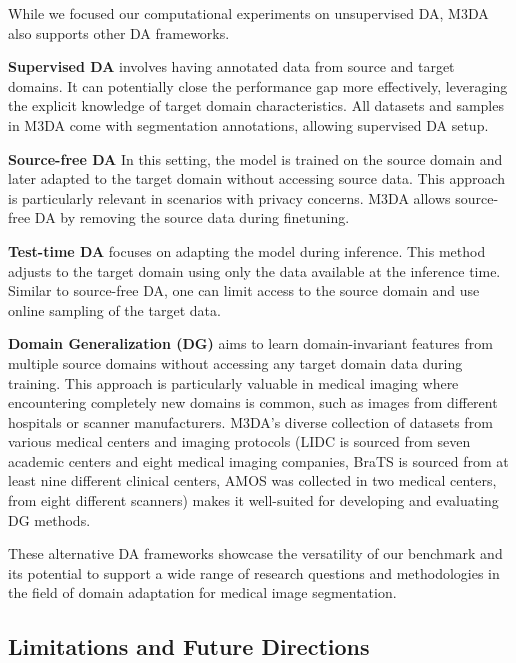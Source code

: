 While we focused our computational experiments on unsupervised DA, M3DA also supports other DA frameworks.

\textbf{Supervised DA} involves having annotated data from source and target domains. It can potentially close the performance gap more effectively, leveraging the explicit knowledge of target domain characteristics. All datasets and samples in M3DA come with segmentation annotations, allowing supervised DA setup.

\textbf{Source-free DA} In this setting, the model is trained on the source domain and later adapted to the target domain without accessing source data. This approach is particularly relevant in scenarios with privacy concerns. M3DA allows source-free DA by removing the source data during finetuning.

\textbf{Test-time DA} focuses on adapting the model during inference. This method adjusts to the target domain using only the data available at the inference time. Similar to source-free DA, one can limit access to the source domain and use online sampling of the target data.

\textbf{Domain Generalization (DG)} aims to learn domain-invariant features from multiple source domains without accessing any target domain data during training. This approach is particularly valuable in medical imaging where encountering completely new domains is common, such as images from different hospitals or scanner manufacturers. M3DA's diverse collection of datasets from various medical centers and imaging protocols (LIDC is sourced from seven academic centers and eight medical imaging companies, BraTS is sourced from at least nine different clinical centers, AMOS was collected in two medical centers, from eight different scanners) makes it well-suited for developing and evaluating DG methods.

These alternative DA frameworks showcase the versatility of our benchmark and its potential to support a wide range of research questions and methodologies in the field of domain adaptation for medical image segmentation.


\subsection{Limitations and Future Directions}
\label{sec:da_bench:exp:limitations}

